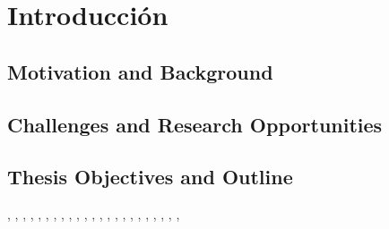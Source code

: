 \chapter{Introducción}


\section{Motivation and Background}


\section{Challenges and Research Opportunities}


\section{Thesis Objectives and Outline}




\cite{10735355},
\cite{10679076},
\cite{10472698},
\cite{10382632},
\cite{10269751},
\cite{10091779},
\cite{10136711},
\cite{10015728},
\cite{9937167},
\cite{9738734},
\cite{9913469},
\cite{9360490},
\cite{9340547},
\cite{9242285},
\cite{9184122},
\cite{9299429},
\cite{9046048},
\cite{8322257},
\cite{7945527},
\cite{8013775},
\cite{7956250},
\cite{7836306},
\cite{7604136},



